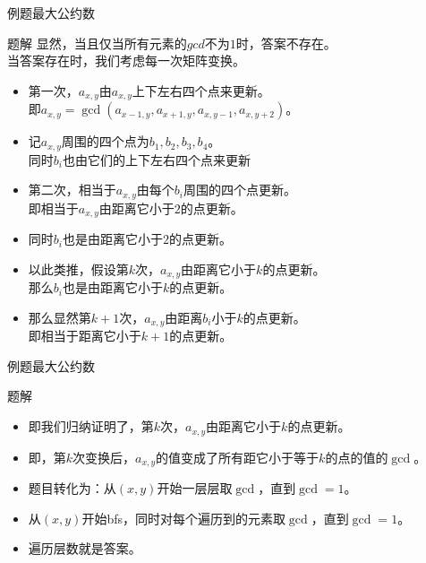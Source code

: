 \begin{frame}[fragile]{例题}{最大公约数}
  \begin{block}{题解}
    显然，当且仅当所有元素的$gcd$不为$1$时，答案不存在。\\
    \pause
    当答案存在时，我们考虑每一次矩阵变换。
    \begin{itemize}
      \pause
      \item 第一次，$a_{x,y}$由$a_{x,y}$上下左右四个点来更新。\\
      即$a_{x,y}=\gcd(a_{x-1,y},a_{x+1,y},a_{x,y-1},a_{x,y+2})$。
      \item 记$a_{x,y}$周围的四个点为$b_1,b_2,b_3,b_4$。\\
      同时$b_i$也由它们的上下左右四个点来更新
      \pause
      \item 第二次，相当于$a_{x,y}$由每个$b_i$周围的四个点更新。\\
      即相当于$a_{x,y}$由距离它小于$2$的点更新。
      \item 同时$b_i$也是由距离它小于$2$的点更新。
      \pause
      \item 以此类推，假设第$k$次，$a_{x,y}$由距离它小于$k$的点更新。\\
      那么$b_i$也是由距离它小于$k$的点更新。
      \pause
      \item 那么显然第$k+1$次，$a_{x,y}$由距离$b_i$小于$k$的点更新。\\
      即相当于距离它小于$k+1$的点更新。
    \end{itemize}
  \end{block}
\end{frame}

\begin{frame}[fragile]{例题}{最大公约数}
  \begin{block}{题解}
    \begin{itemize}
      \item 即我们归纳证明了，第$k$次，$a_{x,y}$由距离它小于$k$的点更新。
      \item 即，第$k$次变换后，$a_{x,y}$的值变成了所有距它小于等于$k$的点的值的$\gcd$。
      \pause
      \item 题目转化为：从$(x,y)$开始一层层取$\gcd$，直到$\gcd=1$。
      \pause
      \item 从$(x,y)$开始bfs，同时对每个遍历到的元素取$\gcd$，直到$\gcd=1$。
      \item 遍历层数就是答案。
    \end{itemize}
  \end{block}
  
\end{frame}

